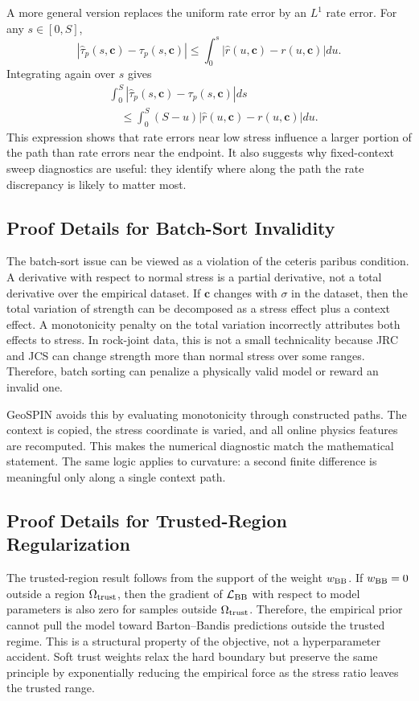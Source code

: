 \documentclass[journal]{IEEEtran}
\begin{document}
A more general version replaces the uniform rate error by an $L^1$ rate error. For any $s\in[0,S]$,
\begin{equation}
|\widehat{\tau}_p(s,\mathbf{c})-\tau_p(s,\mathbf{c})|\le \int_0^s |\widehat r(u,\mathbf{c})-r(u,\mathbf{c})|du.
\end{equation}
Integrating again over $s$ gives
\begin{align}
&\int_0^S |\widehat{\tau}_p(s,\mathbf{c})-\tau_p(s,\mathbf{c})|ds \nonumber\\
&\quad \le \int_0^S (S-u)|\widehat r(u,\mathbf{c})-r(u,\mathbf{c})|du.
\end{align}
This expression shows that rate errors near low stress influence a larger portion of the path than rate errors near the endpoint. It also suggests why fixed-context sweep diagnostics are useful: they identify where along the path the rate discrepancy is likely to matter most.

\subsection{Proof Details for Batch-Sort Invalidity}
The batch-sort issue can be viewed as a violation of the ceteris paribus condition. A derivative with respect to normal stress is a partial derivative, not a total derivative over the empirical dataset. If $\mathbf{c}$ changes with $\sigma$ in the dataset, then the total variation of strength can be decomposed as a stress effect plus a context effect. A monotonicity penalty on the total variation incorrectly attributes both effects to stress. In rock-joint data, this is not a small technicality because JRC and JCS can change strength more than normal stress over some ranges. Therefore, batch sorting can penalize a physically valid model or reward an invalid one.

GeoSPIN avoids this by evaluating monotonicity through constructed paths. The context is copied, the stress coordinate is varied, and all online physics features are recomputed. This makes the numerical diagnostic match the mathematical statement. The same logic applies to curvature: a second finite difference is meaningful only along a single context path.

\subsection{Proof Details for Trusted-Region Regularization}
The trusted-region result follows from the support of the weight $w_{\rm BB}$. If $w_{\rm BB}=0$ outside a region $\Omega_{\rm trust}$, then the gradient of $\mathcal{L}_{\rm BB}$ with respect to model parameters is also zero for samples outside $\Omega_{\rm trust}$. Therefore, the empirical prior cannot pull the model toward Barton--Bandis predictions outside the trusted regime. This is a structural property of the objective, not a hyperparameter accident. Soft trust weights relax the hard boundary but preserve the same principle by exponentially reducing the empirical force as the stress ratio leaves the trusted range.
\end{document}
